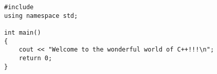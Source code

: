 \documentclass{article}
\begin{document}
 
\begin{lstlisting}[caption={test algorithm}]
#include
using namespace std;
 
int main()
{
    cout << "Welcome to the wonderful world of C++!!!\n";
    return 0;
}
\end{lstlisting}
\end{document}
